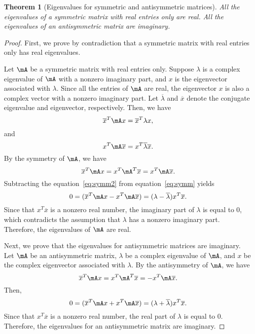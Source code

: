 \documentclass[11pt]{article}
\theoremstyle{plain}
\newtheorem{thm}{Theorem}[section]
\theoremstyle{definition}
\begin{document}
\begin{thm}[Eigenvalues for symmetric and antisymmetric matrices]\label{thm:symmeign}
All the eigenvalues of a symmetric matrix with real entries only are real. All the eigenvalues of an antisymmetric matrix are imaginary.
\end{thm}
\begin{proof}
	First, we prove by contradiction that a symmetric matrix with real entries only has real eigenvalues. 
	
	Let  $\mA$  be a symmetric  matrix with real entries only. Suppose $\lambda$  is a complex eigenvalue of $\mA$ with  a nonzero imaginary part, and $x$ is the eigenvector associated with $\lambda$. Since all the entries of $\mA$ are real, the eigenvector $x$ is also a complex vector with a nonzero imaginary part. Let $\overline \lambda$ and $\overline x$ denote the conjugate eigenvalue and eigenvector, respectively. Then,  we have
	\begin{equation}\label{eq:symm}
		\overline x^T \mA x = \overline x^T \lambda x,
	\end{equation} 
	and
	\begin{equation}\label{eq:symm2}
		x^T \mA \overline x = x^T \overline \lambda \overline x.
	\end{equation}
	 By the symmetry of $\mA$, we have
	\[ \overline x^T \mA x  = x^T \mA^T \overline x = x^T \mA \overline x .\] 
	 Subtracting the equation~\eqref{eq:symm2} from equation~\eqref{eq:symm} yields	\[  0 = ( \overline x^T \mA x -  x^T \mA \overline x ) = (\lambda - \overline \lambda) x^T \overline x.  \]
	Since that $x^T \overline x$ is a nonzero real number, the imaginary part of $\lambda$ is equal to 0, which contradicts the assumption that $\lambda$ has a nonzero imaginary part. Therefore, the eigenvalues of $\mA$ are real.
	
	\vspace{0.2cm}
	Next, we prove that the eigenvalues for antisymmetric matrices are imaginary. 
	Let $\mA$ be an antisymmetric matrix,  $\lambda$ be a complex eigenvalue of $\mA$, and $x$ be the complex eigenvector associated with $\lambda$. By the antisymmetry of $\mA$, we have
	\[ \overline x^T \mA x  = x^T \mA^T \overline x  =  -x^T \mA \overline x .  \] 
	Then, 
	\[  0 = ( \overline x^T \mA x +  x^T \mA \overline x ) = (\lambda + \overline \lambda) x^T \overline x.   \]
	Since that $x^T \overline x$ is a nonzero real number, the real part of $\lambda$ is equal to 0. Therefore, the eigenvalues for an antisymmetric matrix are imaginary.
\end{proof}
\end{document}
